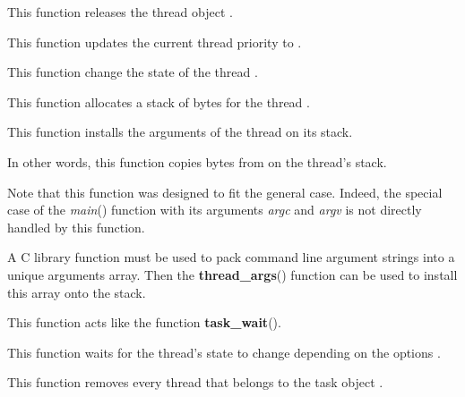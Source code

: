 	 {
	   This function releases the thread object .
	 }

	 {
	   This function updates the current thread priority
	   to .
	 }

	 {
	   This function change the state of the thread .

	 }

	 {
	   This function allocates a stack of  bytes
	   for the thread .

	 }

	 {
	   This function installs the arguments of the thread 
	   on its stack.

	   In other words, this function copies  bytes
	   from  on the thread's stack.

	   Note that this function was designed to fit the general case.
	   Indeed, the special case of the \textit{main}() function
	   with its arguments \textit{argc} and \textit{argv} is not
	   directly handled by this function.

	   A C library function must be used to pack command line
	   argument strings into a unique arguments array. Then the
	   \textbf{thread\_args}() function can be used to install
	   this array onto the stack.

	 }

	 {
	   This function acts like the function \textbf{task\_wait}().

	   This function waits for the thread's state to change depending on
	   the options .

	 }

	 {
	   This function removes every thread that belongs to the
	   task object .
	 }


